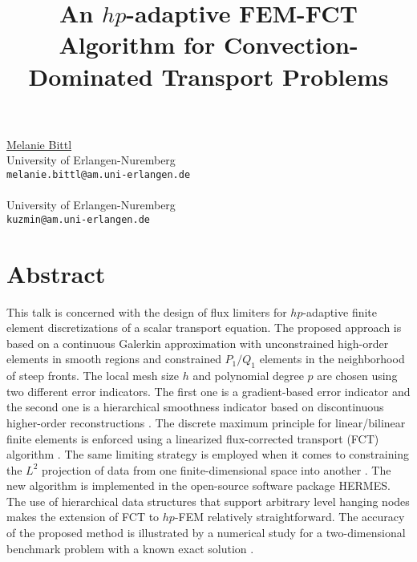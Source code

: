 
\title{An $hp$-adaptive FEM-FCT Algorithm for Convection-Dominated Transport Problems }
\author{}  \institute{}
\maketitle
\begin{center}
{\large \underline{Melanie Bittl}}\\
University of Erlangen-Nuremberg\\
{\tt melanie.bittl@am.uni-erlangen.de}
\\ \vspace{4mm}{\large Dmitri Kuzmin}\\
University of Erlangen-Nuremberg\\
{\tt kuzmin@am.uni-erlangen.de}

\end{center}

\section*{Abstract}
This talk is concerned with the design of flux limiters for $hp$-adaptive
finite element discretizations of a scalar transport equation. The proposed
approach is based on a continuous Galerkin approximation with unconstrained
high-order elements in smooth regions and constrained $P_1/Q_1$ elements in
the neighborhood of steep fronts. The local mesh size $h$ and polynomial
degree $p$ are chosen using two different error indicators. The first one 
is a gradient-based error indicator \cite{zz1987gg} and the second one is a 
hierarchical smoothness indicator based on discontinuous higher-order 
reconstructions \cite{Kuzmin_Friedhelmgg}. The discrete maximum principle for 
linear/bilinear finite elements is enforced using a linearized flux-corrected 
transport (FCT) algorithm \cite{Kuzmingg}. The same limiting strategy is employed
when it comes to constraining the $L^2$ projection of data from one 
finite-dimensional space into another \cite{Kuzmin_2gg}. The new algorithm is 
implemented in the open-source software package HERMES. The use of hierarchical
 data structures that support arbitrary level hanging nodes makes the extension 
of FCT to $hp$-FEM relatively straightforward. The accuracy of the proposed 
method is illustrated by a numerical study for a two-dimensional benchmark 
problem with a known exact solution \cite{Kuzmingg,Johngg}.

